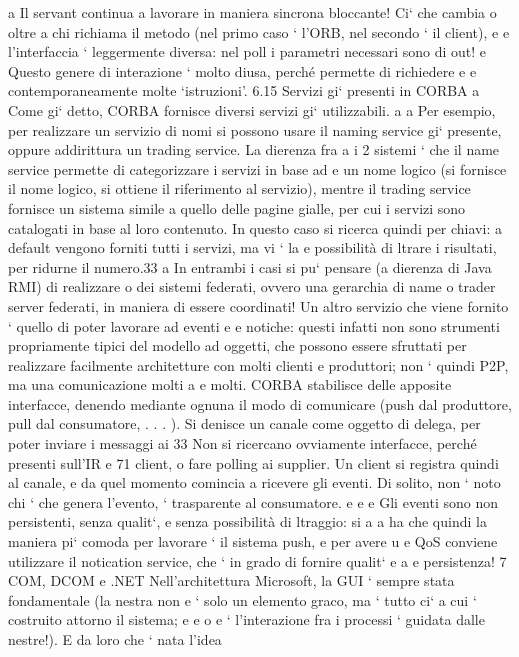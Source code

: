 \documentclass[a4paper,12pt]{article}
\begin{document}
a
Il servant continua a lavorare in maniera sincrona bloccante! Ci` che cambia
o
oltre a chi richiama il metodo (nel primo caso ` l'ORB, nel secondo ` il client),
e
e
l'interfaccia ` leggermente diversa: nel poll i parametri necessari sono di out!
e
Questo genere di interazione ` molto diusa, perché permette di richiedere
e
e
contemporaneamente molte {`}istruzioni'.
6.15
Servizi gi` presenti in CORBA
a
Come gi` detto, CORBA fornisce diversi servizi gi` utilizzabili.
a
a
Per esempio, per realizzare un servizio di nomi si possono usare il naming
service gi` presente, oppure addirittura un trading service. La dierenza fra
a
i 2 sistemi ` che il name service permette di categorizzare i servizi in base ad
e
un nome logico (si fornisce il nome logico, si ottiene il riferimento al servizio),
mentre il trading service fornisce un sistema simile a quello delle pagine gialle,
per cui i servizi sono catalogati in base al loro contenuto. In questo caso si
ricerca quindi per chiavi: a default vengono forniti tutti i servizi, ma vi ` la
e
possibilità di ltrare i risultati, per ridurne il numero.33
a
In entrambi i casi si pu` pensare (a dierenza di Java RMI) di realizzare
o
dei sistemi federati, ovvero una gerarchia di name o trader server federati, in
maniera di essere coordinati!
Un altro servizio che viene fornito ` quello di poter lavorare ad eventi e
e
notiche: questi infatti non sono strumenti propriamente tipici del modello ad
oggetti, che possono essere sfruttati per realizzare facilmente architetture con
molti clienti e produttori; non ` quindi P2P, ma una comunicazione molti a
e
molti.
CORBA stabilisce delle apposite interfacce, denendo mediante ognuna il
modo di comunicare (push dal produttore, pull dal consumatore, . . . ). Si
denisce un canale come oggetto di delega, per poter inviare i messaggi ai
33 Non
si ricercano ovviamente interfacce, perché presenti sull'IR
e
71
\newpage
client, o fare polling ai supplier. Un client si registra quindi al canale, e da
quel momento comincia a ricevere gli eventi.
Di solito, non ` noto chi ` che genera l'evento, ` trasparente al consumatore.
e
e
e
Gli eventi sono non persistenti, senza qualit`, e senza possibilità di ltraggio: si
a
a
ha che quindi la maniera pi` comoda per lavorare ` il sistema push, e per avere
u
e
QoS conviene utilizzare il notication service, che ` in grado di fornire qualit`
e
a
e persistenza!
7
COM, DCOM e .NET
Nell'architettura Microsoft, la GUI ` sempre stata fondamentale (la nestra non
e
` solo un elemento graco, ma ` tutto ci` a cui ` costruito attorno il sistema;
e
e
o
e
`
l'interazione fra i processi ` guidata dalle nestre!). E da loro che ` nata l'idea
\end{document}
